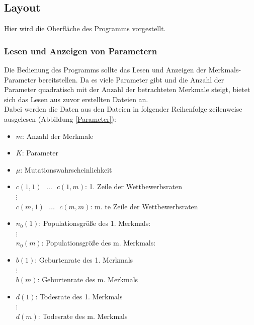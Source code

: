 \documentclass[11pt, a4paper, german]{article}
\theoremstyle{plain}
\begin{document}
	\subsection{Layout}
	Hier wird die Oberfläche des Programms vorgestellt.
	\subsubsection{Lesen und Anzeigen von Parametern}
	Die Bedienung des Programms sollte das Lesen und Anzeigen der Merkmals-Parameter bereitstellen. Da es viele Parameter gibt und die Anzahl der Parameter quadratisch mit der Anzahl der betrachteten Merkmale steigt, bietet sich das Lesen aus zuvor erstellten Dateien an.\\
	Dabei werden die Daten aus den Dateien in folgender Reihenfolge zeilenweise ausgelesen (Abbildung \ref{Parameter}):
	\begin{itemize}
		\item $ m $: Anzahl der Merkmale
		\item $ K $: Parameter
		\item $ \mu $: Mutationswahrscheinlichkeit
		\item $ c(1,1) \text{ } \dots \text{ } c(1,m) $: 1. Zeile der Wettbewerbsraten \\
			$ \vdots $\\
			$ c(m,1) \text{ } \dots \text{ } c(m,m) $: m. te Zeile der Wettbewerbsraten 
		\item $ n_0(1) $: Populationsgröße des 1. Merkmals: \\
			$ \vdots $\\
			$ n_0(m) $: Populationsgröße des m. Merkmals: 
		\item $ b(1) $: Geburtenrate des 1. Merkmals\\
			$ \vdots $\\
			$ b(m) $: Geburtenrate des m. Merkmals
		\item $ d(1) $: Todesrate des 1. Merkmals\\
			$ \vdots $\\
			$ d(m) $: Todesrate des m. Merkmals
	\end{itemize}
	
\end{document}
